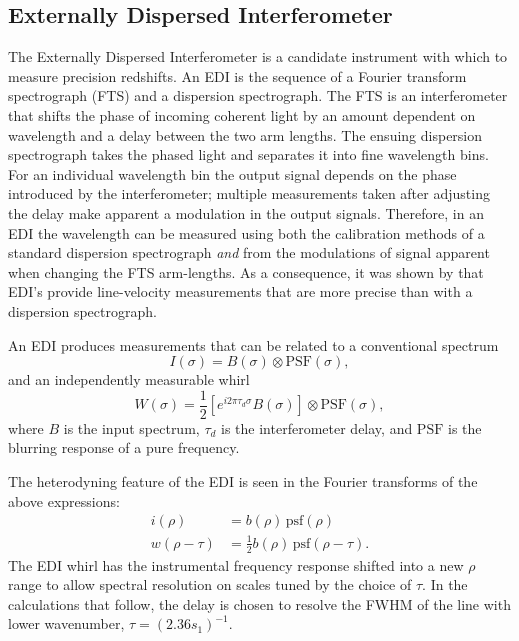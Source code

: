 \documentclass[preprint]{aastex}
\begin{document}
\subsection{Externally Dispersed Interferometer}
The Externally Dispersed Interferometer \citep[EDI;][]{2003PASP..115..255E} is a candidate instrument with which to measure precision redshifts.
An EDI is the sequence of a Fourier transform spectrograph (FTS) and a dispersion spectrograph.  The FTS is an interferometer that shifts
the phase of incoming coherent light
by an amount dependent on wavelength and a  delay between the two arm lengths.
The ensuing dispersion spectrograph takes the phased light and separates it into fine wavelength bins.
For an individual wavelength bin the output signal depends on the phase introduced by the interferometer; multiple
measurements taken after adjusting the delay  make apparent a modulation in the output signals.
Therefore, in an EDI the wavelength can be measured using both the calibration methods of a standard dispersion
spectrograph {\it and} from the modulations of signal apparent when changing the FTS arm-lengths.   As a consequence,
it was shown by
\citet{2003PASP..115..255E} that EDI's provide line-velocity measurements that are more precise than with a dispersion spectrograph.

An EDI produces measurements that can be related
to a conventional spectrum
\begin{equation}
I(\sigma) = B(\sigma) \otimes \mbox{PSF}(\sigma),
\end{equation}
and an independently measurable whirl
\begin{equation}
W(\sigma) = \frac{1}{2}\left[e^{i2\pi\tau_d\sigma}B(\sigma)\right] \otimes \mbox{PSF}(\sigma),
\end{equation}
where $B$ is the input spectrum, $\tau_d$ is the interferometer delay, and $\mbox{PSF}$  is the blurring
response of a pure frequency.

The heterodyning feature of the EDI is seen in the Fourier transforms of the above expressions:
\begin{align}
i(\rho) & =b(\rho) \, \mbox{psf}(\rho)\\
w(\rho -\tau) & =\frac{1}{2} b(\rho) \, \mbox{psf}(\rho-\tau).
\end{align}
The EDI whirl has the instrumental frequency response shifted into a new $\rho$ range to allow
spectral
resolution on scales tuned by the choice of $\tau$.  In the calculations that follow, the delay is chosen to resolve
the FWHM of the line with lower wavenumber, $\tau = (2.36s_1)^{-1}$.
\end{document}
